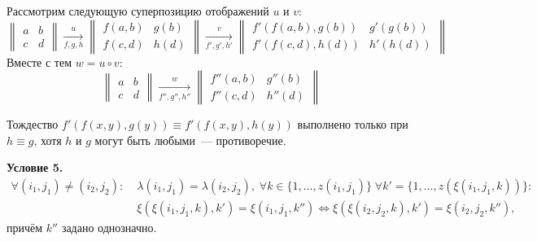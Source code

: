 \documentclass[a4paper, 12pt]{report}
\begin{document}
Рассмотрим следующую суперпозицию отображений $u$ и $v$:
\[
\begin{Vmatrix}
a & b\\
c & d
\end{Vmatrix}
\mathop{\rightarrow}\limits^u_{f,g,h}
\begin{Vmatrix}
f(a,b) & g(b)\\
f(c,d) & h(d)
\end{Vmatrix}
\mathop{\rightarrow}\limits^v_{f',g',h'}
\begin{Vmatrix}
f'(f(a,b), g(b)) & g'(g(b))\\
f'(f(c,d),h(d)) & h'(h(d))
\end{Vmatrix}
\]
Вместе с тем $w = u \circ v$:
\[
\begin{Vmatrix}
a & b\\
c & d
\end{Vmatrix}
\mathop{\rightarrow}\limits^w_{f'',g'',h''}
\begin{Vmatrix}
f''(a,b) & g''(b)\\
f''(c,d) & h''(d)
\end{Vmatrix}
\]

Тождество $f'(f(x,y), g(y)) \equiv f'(f(x,y), h(y))$ выполнено только при $h \equiv g$, хотя $h$ и $g$ могут быть любыми~--- противоречие.

\textbf{Условие 5.}
\begin{equation*}
\begin{split}
 \forall (i_1, j_1) \neq (i_2, j_2): \; & \lambda(i_1, j_1) = \lambda(i_2, j_2), \; \forall k \in \{1, \ldots, z(i_1, j_1)\} \; \forall k' = \{ 1, \ldots, z(\xi(i_1, j_1, k)) \}:\\ & \xi(\xi(i_1, j_1, k), k') = \xi(i_1, j_1, k'') \Leftrightarrow 
\xi(\xi(i_2, j_2, k), k') = \xi(i_2, j_2, k''),
\end{split}
\end{equation*}
причём $k''$ задано однозначно.
\end{document}
